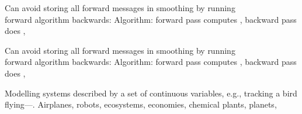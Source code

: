 \documentclass{article}
\begin{document}
\begin{huge}
\vspace{0.2in}

\textwidth
{}


Can avoid storing all forward messages in smoothing by running\\
forward algorithm backwards:
Algorithm: forward pass computes , backward pass does , 

\vspace{0.2in}

\textwidth
{}


Can avoid storing all forward messages in smoothing by running\\
forward algorithm backwards:
Algorithm: forward pass computes , backward pass does , 

\vspace{0.2in}

\textwidth
{}






Modelling systems described by a set of continuous variables,\al
e.g., tracking a bird flying---.\al
Airplanes, robots, ecosystems, economies, chemical plants, planets, \mat{$\ldots$}


\end{huge}
\end{document}
